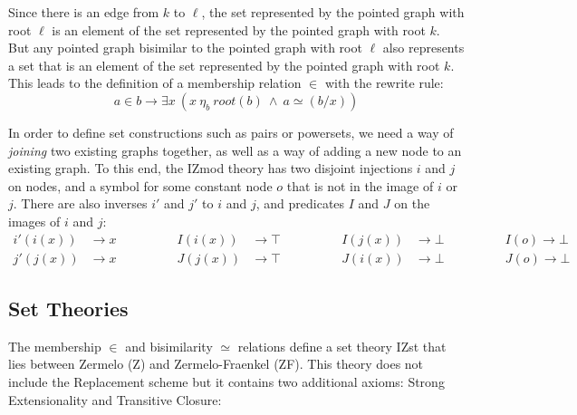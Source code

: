 \documentclass[submission,copyright,creativecommons]{eptcs}
\def\lra{\longrightarrow}
\def\conj{\mathbin{\wedge}}
\def\ex{{\exists}}
\begin{document}
\begin{figure}[h]
\centering
{}
\end{figure}

Since there is an edge from $k$ to $\ell$, the set represented by the pointed graph with root $\ell$ is an element of the set represented by the pointed graph with root $k$. But any pointed graph bisimilar to the pointed graph with root $\ell$ also represents a set that is an element of the set represented by the pointed graph with root $k$. This leads to the definition of a membership relation $\in$ with the rewrite rule:
$$a \in b \lra \ex x~(x~\eta_b~root(b)~\conj~a \simeq (b/x))$$

In order to define set constructions such as pairs or powersets, we need a way of \textit{joining} two existing graphs together, as well as a way of adding a new node to an existing graph. To this end, the IZmod theory has two disjoint injections $i$ and $j$ on nodes, and a symbol for some constant node $o$ that is not in the image of $i$ or $j$. There are also inverses $i'$ and $j'$ to $i$ and $j$, and predicates $I$ and $J$ on the images of $i$ and $j$:
\begin{align*}
i'(i(x)) &\lra x &\qquad\qquad I(i(x)) &\lra \top &\qquad\qquad I(j(x)) &\lra \bot &\qquad\qquad I(o) \lra \bot\\
j'(j(x)) &\lra x &\qquad\qquad J(j(x)) &\lra \top &\qquad\qquad J(i(x)) &\lra \bot &\qquad\qquad J(o) \lra \bot
\end{align*}

\subsection{Set Theories}

The membership $\in$ and bisimilarity $\simeq$ relations define a set theory IZst that lies between Zermelo (Z) and Zermelo-Fraenkel (ZF). This theory does not include the Replacement scheme but it contains two additional axioms: Strong Extensionality and Transitive Closure:\\
\end{document}
